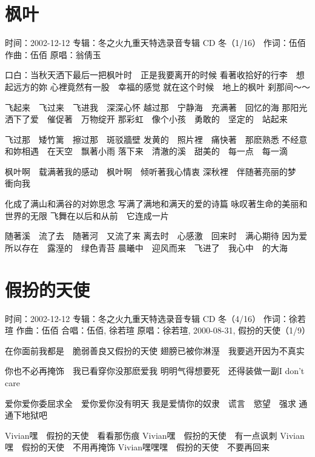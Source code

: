 \documentclass[UTF8,a4paper,oneside,twocolumn,12pt]{ctexbook}
\newcommand{\infopair}[2]{\textbullet #1：#2}
\newcommand{\zc}[1][伍佰]{\infopair{作词}{#1}}
\newcommand{\zq}[1][伍佰]{\infopair{作曲}{#1}}
\newcommand{\zj}[1]{\infopair{专辑}{#1}}
\newcommand{\yc}[1]{\infopair{原唱}{#1}}
\newcommand{\sj}[1]{\infopair{时间}{#1}}
\newenvironment{info}{\begin{flushleft}\kaishu
	}
	{\end{flushleft}\normalsize\yahei\par}
\newenvironment{lyric}{
	}
{}
\begin{document}
\section{枫叶}
\begin{info}
	\sj{2002-12-12}
	\zj{冬之火九重天特选录音专辑 CD 冬（1/16）}
	\zc
	\zq
	\yc{翁倩玉}
\end{info}
\begin{lyric}
	口白：当秋天洒下最后一把枫叶时　正是我要离开的时候
	看著收拾好的行李　想起远方的妳
	心裡竟然有一股　幸福的感觉
	就在这个时候　地上的枫叶
	刹那间～～

	飞起来　飞过来　飞进我　深深心怀
	越过那　宁静海　充满著　回忆的海
	那阳光　洒下了爱　催促著　万物绽开
	那彩虹　像个小孩　勇敢的　坚定的　站起来

	飞过那　矮竹篱　擦过那　斑驳牆壁
	发黄的　照片裡　痛快著　那麽熟悉
	不经意　和妳相遇　在天空　飘著小雨
	落下来　清澈的溪　甜美的　每一点　每一滴

	枫叶啊　载满著我的感动　枫叶啊　倾听著我心情衷
	深秋裡　伴随著亮丽的梦　衝向我

	化成了满山和满谷的对妳思念
	写满了满地和满天的爱的诗篇
	咏叹著生命的美丽和世界的无限
	飞舞在以后和从前　它连成一片

	随著溪　流了去　随著河　又流了来
	离去时　心感激　回来时　满心期待
	因为爱　所以存在　露溼的　绿色青苔
	晨曦中　迎风而来　飞进了　我心中　的大海
\end{lyric}

\section{假扮的天使}
\begin{info}
	\sj{2002-12-12}
	\zj{冬之火九重天特选录音专辑 CD 冬（4/16）}
	\zc[徐若瑄]
	\zq
	\infopair{合唱}{伍佰, 徐若瑄}
	\yc{徐若瑄, 2000-08-31, 假扮的天使（1/9）}
\end{info}
\begin{lyric}
	在你面前我都是　脆弱善良又假扮的天使
	翅膀已被你淋溼　我要逃开因为不真实

	你也不必再掩饰　我已看穿你没那麽爱我
	明明气得想要死　还得装做一副I don't care

	爱你爱你委屈求全　爱你爱你没有明天
	我是爱情你的奴隶　谎言　慾望　强求
	通通下地狱吧

	Vivian嘿　假扮的天使　看看那伤痕
	Vivian嘿　假扮的天使　有一点讽刺
	Vivian嘿　假扮的天使　不用再掩饰
	Vivian嘿嘿嘿　假扮的天使　不要再回来
\end{lyric}
\end{document}
